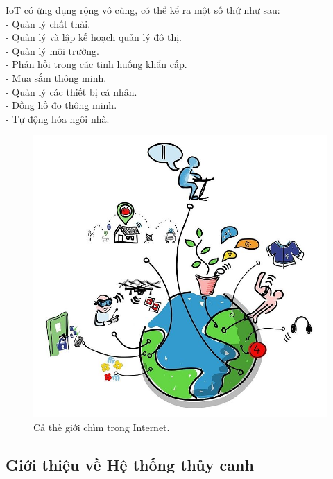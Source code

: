 \documentclass[a4paper,12pt,oneside]{article}
\begin{document}
\noindent IoT có ứng dụng rộng vô cùng, có thể kể ra một số thứ như sau:\\
- Quản lý chất thải.\\
- Quản lý và lập kế hoạch quản lý đô thị.\\
- Quản lý môi trường.\\
- Phản hồi trong các tinh huống khẩn cấp.\\
- Mua sắm thông minh.\\
- Quản lý các thiết bị cá nhân.\\
- Đồng hồ đo thông minh.\\
- Tự động hóa ngôi nhà.\\
\begin{center}
\begin{figure}[htp]
\begin{center}
\includegraphics[scale=.4]{hinh/IoT_ungdung.jpg}
\end{center}
\caption{Cả thế giới chìm trong Internet.}

\end{figure}
\end{center}

\subsection{Giới thiệu về Hệ thống thủy canh}
\end{document}
